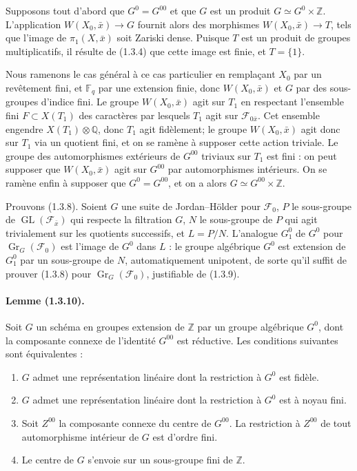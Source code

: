 \documentclass[11pt]{article}
\theoremstyle{remark}
\newcommand{\ZZ}{\mathbb{Z}}
\newcommand{\Fq}{\mathbb{F}_q}
\newcommand{\GL}{\operatorname{GL}}
\begin{document}
Supposons tout d'abord que $G^0=G^{00}$ et que $G$ est un produit $G\simeq G^0\times\ZZ$. L'application $W(X_0,\bar x)\to G$ fournit alors des morphismes $W(X_0,\bar x)\to T$, tels que l'image de $\pi_1(X,\bar x)$ soit Zariski dense. Puisque $T$ est un produit de groupes multiplicatifs, il résulte de (1.3.4) que cette image est finie, et $T=\{1\}$.

Nous ramenons le cas général à ce cas particulier en remplaçant $X_0$ par un revêtement fini, et $\Fq$ par une extension finie, donc $W(X_0,\bar x)$ et $G$ par des sous-groupes d'indice fini. Le groupe $W(X_0,\bar x)$ agit sur $T_1$ en respectant l'ensemble fini $F\subset X(T_1)$ des caractères par lesquels $T_1$ agit sur $\mathcal F_{0\bar x}$. Cet ensemble engendre $X(T_1)\otimes\mathbb Q$, donc $T_1$ agit fidèlement; le groupe $W(X_0,\bar x)$ agit donc sur $T_1$ via un quotient fini, et on se ramène à supposer cette action triviale. Le groupe des automorphismes extérieurs de $G^{00}$ triviaux sur $T_1$ est fini : on peut supposer que $W(X_0,\bar x)$ agit sur $G^{00}$ par automorphismes intérieurs. On se ramène enfin à supposer que $G^0=G^{00}$, et on a alors $G\simeq G^{00}\times\ZZ$.

Prouvons (1.3.8). Soient $G$ une suite de Jordan--Hölder pour $\mathcal F_0$, $P$ le sous-groupe de $\GL(\mathcal F_{\bar x})$ qui respecte la filtration $G$, $N$ le sous-groupe de $P$ qui agit trivialement sur les quotients successifs, et $L=P/N$. L'analogue $G_1^0$ de $G^0$ pour $\operatorname{Gr}_G(\mathcal F_0)$ est l'image de $G^0$ dans $L$ : le groupe algébrique $G^0$ est extension de $G_1^0$ par un sous-groupe de $N$, automatiquement unipotent, de sorte qu'il suffit de prouver (1.3.8) pour $\operatorname{Gr}_G(\mathcal F_0)$, justifiable de (1.3.9).

\paragraph{Lemme (1.3.10).} Soit $G$ un schéma en groupes extension de $\ZZ$ par un groupe algébrique $G^0$, dont la composante connexe de l'identité $G^{00}$ est réductive. Les conditions suivantes sont équivalentes :
\begin{enumerate}[label=(\roman*)]
\item $G$ admet une représentation linéaire dont la restriction à $G^0$ est fidèle.
\item $G$ admet une représentation linéaire dont la restriction à $G^0$ est à noyau fini.
\item Soit $Z^{00}$ la composante connexe du centre de $G^{00}$. La restriction à $Z^{00}$ de tout automorphisme intérieur de $G$ est d'ordre fini.
\item Le centre de $G$ s'envoie sur un sous-groupe fini de $\ZZ$.
\end{enumerate}
\end{document}
